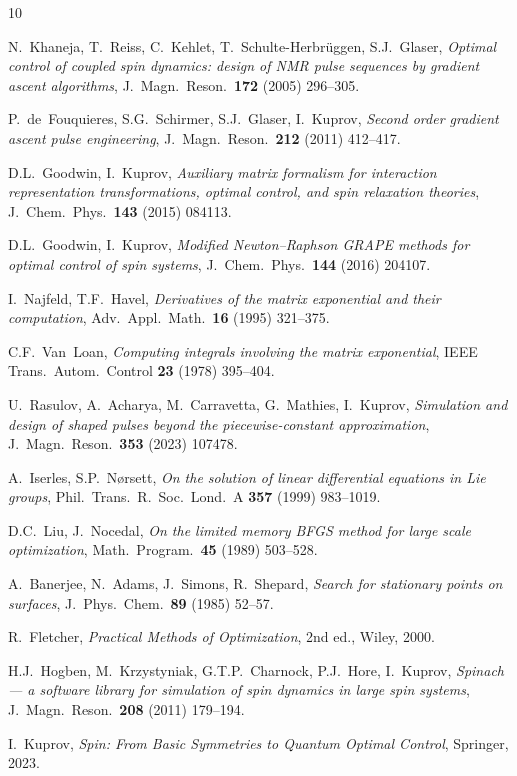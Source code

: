 \documentclass[11pt,a4paper]{article}
\begin{document}
\begin{thebibliography}{10}

N.~Khaneja, T.~Reiss, C.~Kehlet, T.~Schulte-Herbr\"uggen, S.J.~Glaser,
\emph{Optimal control of coupled spin dynamics: design of NMR pulse
sequences by gradient ascent algorithms},
J.~Magn.~Reson.\ \textbf{172} (2005) 296--305.

P.~de~Fouquieres, S.G.~Schirmer, S.J.~Glaser, I.~Kuprov,
\emph{Second order gradient ascent pulse engineering},
J.~Magn.~Reson.\ \textbf{212} (2011) 412--417.

D.L.~Goodwin, I.~Kuprov,
\emph{Auxiliary matrix formalism for interaction representation
transformations, optimal control, and spin relaxation theories},
J.~Chem.~Phys.\ \textbf{143} (2015) 084113.

D.L.~Goodwin, I.~Kuprov,
\emph{Modified Newton--Raphson GRAPE methods for optimal control of
spin systems},
J.~Chem.~Phys.\ \textbf{144} (2016) 204107.

I.~Najfeld, T.F.~Havel,
\emph{Derivatives of the matrix exponential and their computation},
Adv.~Appl.~Math.\ \textbf{16} (1995) 321--375.

C.F.~Van~Loan,
\emph{Computing integrals involving the matrix exponential},
IEEE Trans.\ Autom.\ Control \textbf{23} (1978) 395--404.

U.~Rasulov, A.~Acharya, M.~Carravetta, G.~Mathies, I.~Kuprov,
\emph{Simulation and design of shaped pulses beyond the
piecewise-constant approximation},
J.~Magn.~Reson.\ \textbf{353} (2023) 107478.

A.~Iserles, S.P.~N{\o}rsett,
\emph{On the solution of linear differential equations in Lie groups},
Phil.~Trans.~R.~Soc.~Lond.~A \textbf{357} (1999) 983--1019.

D.C.~Liu, J.~Nocedal,
\emph{On the limited memory BFGS method for large scale optimization},
Math.~Program.\ \textbf{45} (1989) 503--528.

A.~Banerjee, N.~Adams, J.~Simons, R.~Shepard,
\emph{Search for stationary points on surfaces},
J.~Phys.~Chem.\ \textbf{89} (1985) 52--57.

R.~Fletcher,
\emph{Practical Methods of Optimization}, 2nd ed., Wiley, 2000.

H.J.~Hogben, M.~Krzystyniak, G.T.P.~Charnock, P.J.~Hore, I.~Kuprov,
\emph{Spinach --- a software library for simulation of spin dynamics
in large spin systems},
J.~Magn.~Reson.\ \textbf{208} (2011) 179--194.

I.~Kuprov,
\emph{Spin: From Basic Symmetries to Quantum Optimal Control},
Springer, 2023.

\end{thebibliography}
\end{document}
